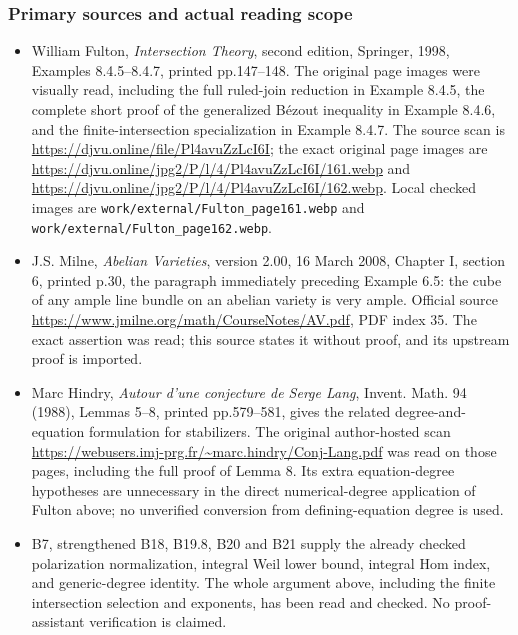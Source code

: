 \subsubsection{Primary sources and actual reading scope}\label{primary-sources-and-actual-reading-scope}

\begin{itemize}
\tightlist
\item
  William Fulton, \emph{Intersection Theory}, second edition, Springer, 1998, Examples 8.4.5--8.4.7, printed pp.147--148. The original page images were visually read, including the full ruled-join reduction in Example 8.4.5, the complete short proof of the generalized Bézout inequality in Example 8.4.6, and the finite-intersection specialization in Example 8.4.7. The source scan is \url{https://djvu.online/file/Pl4avuZzLcI6I}; the exact original page images are \url{https://djvu.online/jpg2/P/l/4/Pl4avuZzLcI6I/161.webp} and \url{https://djvu.online/jpg2/P/l/4/Pl4avuZzLcI6I/162.webp}. Local checked images are \texttt{work/external/Fulton\_page161.webp} and \texttt{work/external/Fulton\_page162.webp}.
\item
  J.S. Milne, \emph{Abelian Varieties}, version 2.00, 16 March 2008, Chapter I, section 6, printed p.30, the paragraph immediately preceding Example 6.5: the cube of any ample line bundle on an abelian variety is very ample. Official source \url{https://www.jmilne.org/math/CourseNotes/AV.pdf}, PDF index 35. The exact assertion was read; this source states it without proof, and its upstream proof is imported.
\item
  Marc Hindry, \emph{Autour d'une conjecture de Serge Lang}, Invent. Math. 94 (1988), Lemmas 5--8, printed pp.579--581, gives the related degree-and-equation formulation for stabilizers. The original author-hosted scan \url{https://webusers.imj-prg.fr/~marc.hindry/Conj-Lang.pdf} was read on those pages, including the full proof of Lemma 8. Its extra equation-degree hypotheses are unnecessary in the direct numerical-degree application of Fulton above; no unverified conversion from defining-equation degree is used.
\item
  B7, strengthened B18, B19.8, B20 and B21 supply the already checked polarization normalization, integral Weil lower bound, integral Hom index, and generic-degree identity. The whole argument above, including the finite intersection selection and exponents, has been read and checked. No proof-assistant verification is claimed.
\end{itemize}


